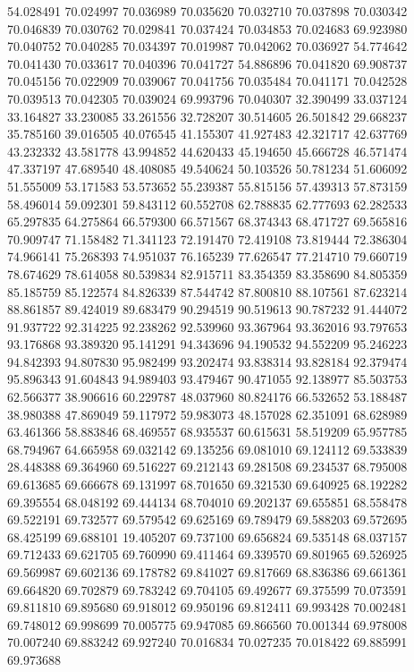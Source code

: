 54.028491
70.024997
70.036989
70.035620
70.032710
70.037898
70.030342
70.046839
70.030762
70.029841
70.037424
70.034853
70.024683
69.923980
70.040752
70.040285
70.034397
70.019987
70.042062
70.036927
54.774642
70.041430
70.033617
70.040396
70.041727
54.886896
70.041820
69.908737
70.045156
70.022909
70.039067
70.041756
70.035484
70.041171
70.042528
70.039513
70.042305
70.039024
69.993796
70.040307
32.390499
33.037124
33.164827
33.230085
33.261556
32.728207
30.514605
26.501842
29.668237
35.785160
39.016505
40.076545
41.155307
41.927483
42.321717
42.637769
43.232332
43.581778
43.994852
44.620433
45.194650
45.666728
46.571474
47.337197
47.689540
48.408085
49.540624
50.103526
50.781234
51.606092
51.555009
53.171583
53.573652
55.239387
55.815156
57.439313
57.873159
58.496014
59.092301
59.843112
60.552708
62.788835
62.777693
62.282533
65.297835
64.275864
66.579300
66.571567
68.374343
68.471727
69.565816
70.909747
71.158482
71.341123
72.191470
72.419108
73.819444
72.386304
74.966141
75.268393
74.951037
76.165239
77.626547
77.214710
79.660719
78.674629
78.614058
80.539834
82.915711
83.354359
83.358690
84.805359
85.185759
85.122574
84.826339
87.544742
87.800810
88.107561
87.623214
88.861857
89.424019
89.683479
90.294519
90.519613
90.787232
91.444072
91.937722
92.314225
92.238262
92.539960
93.367964
93.362016
93.797653
93.176868
93.389320
95.141291
94.343696
94.190532
94.552209
95.246223
94.842393
94.807830
95.982499
93.202474
93.838314
93.828184
92.379474
95.896343
91.604843
94.989403
93.479467
90.471055
92.138977
85.503753
62.566377
38.906616
60.229787
48.037960
80.824176
66.532652
53.188487
38.980388
47.869049
59.117972
59.983073
48.157028
62.351091
68.628989
63.461366
58.883846
68.469557
68.935537
60.615631
58.519209
65.957785
68.794967
64.665958
69.032142
69.135256
69.081010
69.124112
69.533839
28.448388
69.364960
69.516227
69.212143
69.281508
69.234537
68.795008
69.613685
69.666678
69.131997
68.701650
69.321530
69.640925
68.192282
69.395554
68.048192
69.444134
68.704010
69.202137
69.655851
68.558478
69.522191
69.732577
69.579542
69.625169
69.789479
69.588203
69.572695
68.425199
69.688101
19.405207
69.737100
69.656824
69.535148
68.037157
69.712433
69.621705
69.760990
69.411464
69.339570
69.801965
69.526925
69.569987
69.602136
69.178782
69.841027
69.817669
68.836386
69.661361
69.664820
69.702879
69.783242
69.704105
69.492677
69.375599
70.073591
69.811810
69.895680
69.918012
69.950196
69.812411
69.993428
70.002481
69.748012
69.998699
70.005775
69.947085
69.866560
70.001344
69.978008
70.007240
69.883242
69.927240
70.016834
70.027235
70.018422
69.885991
69.973688

